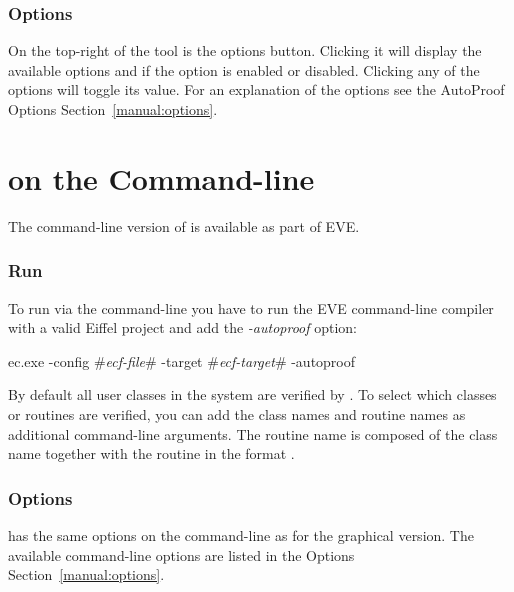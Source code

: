 \subsubsection{Options}

    On the top-right of the \AutoProof tool is the options button. Clicking it will display the available options and if the option is enabled or disabled. Clicking any of the options will toggle its value. For an explanation of the options see the AutoProof Options Section~\ref{manual:options}.


\section{\AutoProof on the Command-line}

    The command-line version of \AutoProof is available as part of EVE.

\subsubsection{Run \AutoProof}

    To run \AutoProof via the command-line you have to run the EVE command-line compiler with a valid Eiffel project and add the \emph{-autoproof} option: 

\begin{erunning}
  ec.exe -config #\emph{ecf-file}# -target #\emph{ecf-target}# -autoproof
\end{erunning}


    By default all user classes in the system are verified by \AutoProof. To select which classes or routines are verified, you can add the class names and routine names as additional command-line arguments. The routine name is composed of the class name together with the routine in the format .

\subsubsection{Options}

    \AutoProof has the same options on the command-line as for the graphical version. The available command-line options are listed in the \AutoProof Options Section~\ref{manual:options}.


